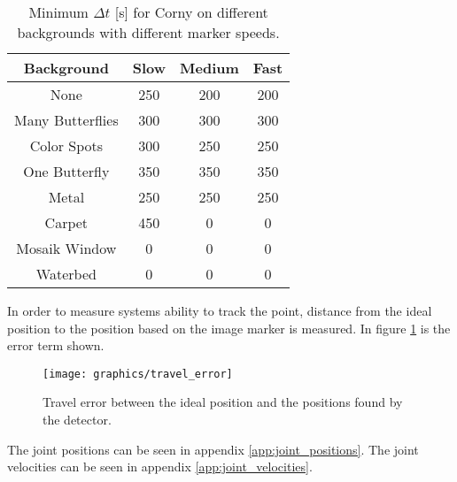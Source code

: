 
\begin{table}[H]
\center
\begin{tabular}{|c|c|c|c|}
\hline
Background & Slow & Medium & Fast \\ \hline
None & 250 & 200 & 200\\ \hline 
Many Butterflies & 300 & 300 & 300\\ \hline 
Color Spots & 300 & 250 & 250\\ \hline 
One Butterfly & 350 & 350 & 350\\ \hline 
Metal & 250 & 250 & 250\\ \hline 
Carpet & 450 & 0 & 0 \\ \hline
Mosaik Window & 0 & 0 & 0 \\ \hline
Waterbed & 0 & 0 & 0 \\ \hline
\end{tabular}
\caption{Minimum $\Delta t$ [s] for Corny on different backgrounds with different marker speeds.}
\label{tb:min_dt_corny}
\end{table}

In order to measure systems ability to track the point, distance from the ideal position to the position based on the image marker is measured.
In figure \ref{fig:travel_error} is the error term shown.

\begin{figure}
 \centering
 \texttt{[image: graphics/travel\_error]} %
 \caption{Travel error between the ideal position and the positions found by the detector.}
 \label{fig:travel_error}
\end{figure}

The joint positions can be seen in appendix \ref{app:joint_positions}.
The joint velocities can be seen in appendix \ref{app:joint_velocities}.